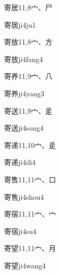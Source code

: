 \begin{Entry}{寄居}{11,8}{⼧、⼫}
  \begin{Phonetics}{寄居}{ji4ju1}
  \end{Phonetics}
\end{Entry}

\begin{Entry}{寄放}{11,8}{⼧、⽅}
  \begin{Phonetics}{寄放}{ji4fang4}
  \end{Phonetics}
\end{Entry}

\begin{Entry}{寄养}{11,9}{⼧、⼋}
  \begin{Phonetics}{寄养}{ji4yang3}
  \end{Phonetics}
\end{Entry}

\begin{Entry}{寄送}{11,9}{⼧、⾡}
  \begin{Phonetics}{寄送}{ji4song4}
  \end{Phonetics}
\end{Entry}

\begin{Entry}{寄递}{11,10}{⼧、⾡}
  \begin{Phonetics}{寄递}{ji4di4}
  \end{Phonetics}
\end{Entry}

\begin{Entry}{寄售}{11,11}{⼧、⼝}
  \begin{Phonetics}{寄售}{ji4shou4}
  \end{Phonetics}
\end{Entry}

\begin{Entry}{寄宿}{11,11}{⼧、⼧}
  \begin{Phonetics}{寄宿}{ji4su4}
  \end{Phonetics}
\end{Entry}

\begin{Entry}{寄望}{11,11}{⼧、⽉}
  \begin{Phonetics}{寄望}{ji4wang4}
  \end{Phonetics}
\end{Entry}

